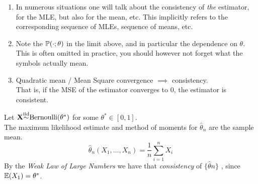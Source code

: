\documentclass[11pt,a4paper]{article}
\begin{document}
\begin{enumerate}[label=\roman*)]
	\item In numerous situations one will talk about the consistency of \textit{the} estimator, \eg for the MLE, but also for the mean, etc. This implicitly refers to the corresponding sequence of MLEs, sequence of means, etc.
	\item Note the $\mathbb{P}(\cdot;\theta)$ in the limit above, and in particular the dependence on $\theta$. This is often omitted in practice, you should however not forget what the symbols actually mean.
	\item Quadratic mean / Mean Square convergence $\implies$ consistency.\\
	That is, if the MSE of the estimator converges to 0, the estimator is consistent.
\end{enumerate}

Let $\textbf{X}{\overset{\text{iid}}{\sim}}\text{Bernoulli}(\theta^*)$ for some $\theta^*\in[0,1]$.\\
The maximum likelihood estimate and method of moments for $\hat{\theta}_n$ are the sample mean.\\
$${\hat{\theta}_n(X_1,\dots,X_n)=\frac{1}{n}\sum\limits_{i=1}^nX_i}$$
By the \textit{Weak Law of Large Numbers} we have that \textit{consistency} of $\{\hat{\theta}n\}$ , since $\mathbb{E}(X_1)=\theta^*$.\\
\end{document}

